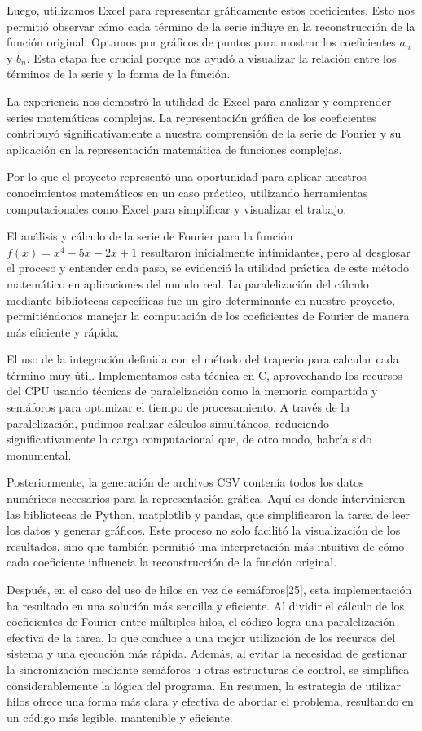 Luego, utilizamos Excel para representar gráficamente estos coeficientes. Esto nos permitió observar cómo cada término de la serie influye en la reconstrucción de la función original. Optamos por gráficos de puntos para mostrar los coeficientes \(a_n\) y \(b_n\). Esta etapa fue crucial porque nos ayudó a visualizar la relación entre los términos de la serie y la forma de la función.

La experiencia nos demostró la utilidad de Excel para analizar y comprender series matemáticas complejas. La representación gráfica de los coeficientes contribuyó significativamente a nuestra comprensión de la serie de Fourier y su aplicación en la representación matemática de funciones complejas.

Por lo que el proyecto representó una oportunidad para aplicar nuestros conocimientos matemáticos en un caso práctico, utilizando herramientas computacionales como Excel para simplificar y visualizar el trabajo.

El análisis y cálculo de la serie de Fourier para la función \(f(x)=x^4-5x-2x+1\) resultaron inicialmente intimidantes, pero al desglosar el proceso y entender cada paso, se evidenció la utilidad práctica de este método matemático en aplicaciones del mundo real. La paralelización del cálculo mediante bibliotecas específicas fue un giro determinante en nuestro proyecto, permitiéndonos manejar la computación de los coeficientes de Fourier de manera más eficiente y rápida.

El uso de la integración definida con el método del trapecio\cite*{khan-academy-regla-trapecio-no-date} para calcular cada término muy útil. Implementamos esta técnica en C, aprovechando los recursos del CPU usando técnicas de paralelización como la memoria compartida y semáforos para optimizar el tiempo de procesamiento. A través de la paralelización, pudimos realizar cálculos simultáneos, reduciendo significativamente la carga computacional que, de otro modo, habría sido monumental.

Posteriormente, la generación de archivos CSV contenía todos los datos numéricos necesarios para la representación gráfica. Aquí es donde intervinieron las bibliotecas de Python, matplotlib y pandas, que simplificaron la tarea de leer los datos y generar gráficos. Este proceso no solo facilitó la visualización de los resultados, sino que también permitió una interpretación más intuitiva de cómo cada coeficiente influencia la reconstrucción de la función original.

Después, en el caso del uso de hilos en vez de semáforos{[}25{]}, esta implementación ha resultado en una solución más sencilla y eficiente. Al dividir el cálculo de los coeficientes de Fourier entre múltiples hilos, el código logra una paralelización efectiva de la tarea, lo que conduce a una mejor utilización de los recursos del sistema y una ejecución más rápida. Además, al evitar la necesidad de gestionar la sincronización mediante semáforos u otras estructuras de control, se simplifica considerablemente la lógica del programa. En resumen, la estrategia de utilizar hilos ofrece una forma más clara y efectiva de abordar el problema, resultando en un código más legible, mantenible y eficiente.

